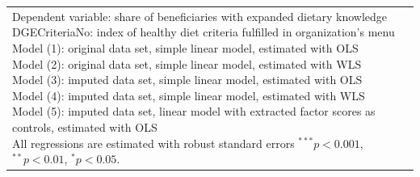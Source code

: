 \begin{frame}
\begin{table}
\begin{center}
{\begin{tabular}{l c c c c c }
\hline
\multicolumn{6}{l}{\scriptsize{\parbox{\linewidth}
{\vspace{2pt} Dependent variable: share of beneficiaries with expanded dietary knowledge \\ DGECriteriaNo: index of healthy diet criteria fulfilled in organization's menu \\ Model (1): original data set, simple linear model, estimated with OLS \\ Model (2): original data set, simple linear model, estimated with WLS \\ Model (3): imputed data set, simple linear model, estimated with OLS \\ Model (4): imputed data set, simple linear model, estimated with WLS \\ Model (5): imputed data set, linear model with extracted factor scores as controls, estimated with OLS \\ All regressions are estimated with robust standard errors $^{***}p<0.001$, $^{**}p<0.01$, $^*p<0.05$.}}}
\end{tabular}
}
\label{HealthRegressions-DietaryKnowledge}
\end{center}
\end{table}

\end{frame}

